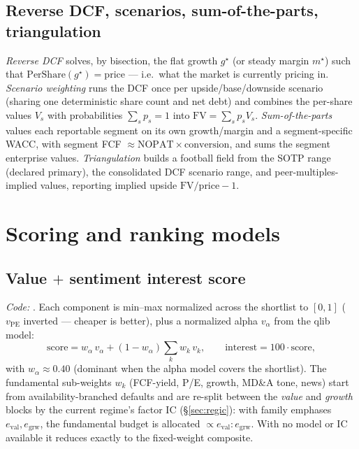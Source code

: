 \documentclass[11pt]{article}
\begin{document}
\subsection{Reverse DCF, scenarios, sum-of-the-parts, triangulation}
\emph{Reverse DCF} solves, by bisection, the flat growth $g^\star$ (or steady
margin $m^\star$) such that $\text{PerShare}(g^\star)=\text{price}$ --- i.e.\ what
the market is currently pricing in. \emph{Scenario weighting} runs the DCF once per
upside/base/downside scenario (sharing one deterministic share count and net debt)
and combines the per-share values $V_s$ with probabilities $\sum_s p_s=1$ into
$\text{FV}=\sum_s p_s V_s$. \emph{Sum-of-the-parts} values each reportable segment
on its own growth/margin and a segment-specific WACC, with segment FCF
$\approx\text{NOPAT}\times\text{conversion}$, and sums the segment enterprise
values. \emph{Triangulation} builds a football field from the SOTP range
(declared primary), the consolidated DCF scenario range, and peer-multiples-implied
values, reporting implied upside $\text{FV}/\text{price}-1$.

\section{Scoring and ranking models}
\label{sec:score}

\subsection{Value $+$ sentiment interest score}
\label{sec:interest}
\emph{Code:} . Each component is min--max
normalized across the shortlist to $[0,1]$ ($v_{\text{PE}}$ inverted --- cheaper is
better), plus a normalized alpha $v_\alpha$ from the qlib model:
\begin{equation}
  \text{score}=w_\alpha\,v_\alpha+(1-w_\alpha)\sum_k w_k\,v_k,
  \qquad \text{interest}=100\cdot\text{score},
\end{equation}
with $w_\alpha\approx0.40$ (dominant when the alpha model covers the shortlist).
The fundamental sub-weights $w_k$ (FCF-yield, P/E, growth, MD\&A tone, news) start
from availability-branched defaults and are re-split between the \emph{value} and
\emph{growth} blocks by the current regime's factor IC (\S\ref{sec:regic}): with
family emphases $e_{\text{val}},e_{\text{grw}}$, the fundamental budget is allocated
$\propto e_{\text{val}}:e_{\text{grw}}$. With no model or IC available it reduces
exactly to the fixed-weight composite.
\end{document}
